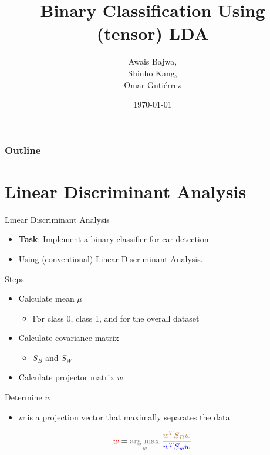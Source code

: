 \documentclass[handout]{beamer}
\title[\insertdate]{Binary Classification Using (tensor) LDA}
\author{Awais Bajwa,\\ Shinho Kang,\\ Omar Guti\'errez}
\date{\today}
\newcommand{\argmax}[1]{\underset{#1}{\operatorname{arg}\,\operatorname{max}}\;}
\begin{document}
\begin{frame}
\titlepage
\end{frame}
\note{}

\begin{frame}
    \frametitle{Outline} 
    \tableofcontents
\end{frame}
\note{}

\section{Linear Discriminant Analysis}
\begin{frame}{Linear Discriminant Analysis}
    \begin{itemize}
        \item \textbf{Task}: Implement a binary classifier for car detection.
        \item Using (conventional) Linear Discriminant Analysis.
    \end{itemize}
\end{frame}
\note{}

\begin{frame}{Steps}
    \begin{itemize}
        \item Calculate mean $\mu$
            \begin{itemize}
                \item For class 0, class 1, and for the overall dataset
            \end{itemize}
        \item Calculate covariance matrix
            \begin{itemize}
                \item $S_B$ and $S_W$
            \end{itemize}
        \item Calculate projector matrix $w$
    \end{itemize}
\end{frame}
\note{}

\begin{frame}{Determine $w$}
    \begin{itemize}
        \item $w$ is a projection vector that maximally separates the data
    \end{itemize}
\Huge{
\begin{equation}
    \textcolor{red}{w} = 
    \textcolor{gray}{\argmax{w}}
    \frac{\textcolor{brown}{w^TS_Bw}}
    {\textcolor{blue}{w^TS_ww}}
\end{equation}
}
\end{frame}
\end{document}

